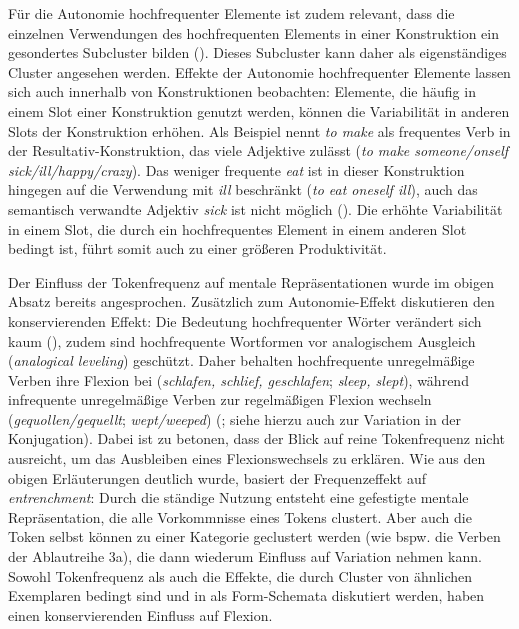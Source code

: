Für die Autonomie hochfrequenter Elemente ist zudem relevant, dass die einzelnen Verwendungen des hochfrequenten Elements in einer Konstruktion ein gesondertes Subcluster bilden (\cite[69--70]{Goldberg.2019}). Dieses Subcluster kann daher als eigenständiges Cluster angesehen werden. Effekte der Autonomie hochfrequenter Elemente lassen sich  auch innerhalb von Konstruktionen beobachten: Elemente, die häufig in einem Slot einer Konstruktion genutzt werden, können die Variabilität in anderen Slots der Konstruktion erhöhen. Als Beispiel nennt \textcite[69]{Goldberg.2019} \textit{to make} als frequentes Verb in der Resultativ-Konstruktion, das viele Adjektive zulässt (\textit{to make someone/onself sick/ill/happy/crazy}). Das weniger frequente \textit{eat} ist in dieser Konstruktion hingegen auf die Verwendung mit \textit{ill} beschränkt (\textit{to eat oneself ill}), auch das semantisch verwandte Adjektiv \textit{sick} ist nicht möglich (\cite[69]{Goldberg.2019}). Die erhöhte Variabilität in einem Slot, die durch ein hochfrequentes Element in einem anderen Slot bedingt ist, führt somit auch zu einer größeren Produktivität.

\begin{sloppypar}
Der Einfluss der Tokenfrequenz auf mentale Repräsentationen wurde im obigen Absatz bereits angesprochen. Zusätzlich zum Autonomie-Effekt diskutieren \textcite[378--384]{Bybee.1997} den konservierenden Effekt: Die Bedeutung hochfrequenter Wörter verändert sich kaum (\cite[12--13]{Ellis.2012}), zudem sind hochfrequente Wortformen vor analogischem Ausgleich (\textit{analogical leveling}) ge\-schützt. Daher behalten hochfrequente unregelmäßige Verben ihre Flexion bei (\textit{schlafen, schlief, geschlafen}; \textit{sleep, slept}), während infrequente unregelmäßige Verben zur regelmäßigen Flexion wechseln (\textit{gequollen/gequellt}; \textit{wept/weeped}) (\cites[119--120]{Bybee.1985}[280]{Bybee.1997}; siehe hierzu auch  zur Variation in der Konjugation). Dabei ist zu betonen, dass der Blick auf reine Tokenfrequenz nicht ausreicht, um das Ausbleiben eines Flexionswechsels zu erklären. Wie aus den obigen Erläuterungen deutlich wurde, basiert der Frequenzeffekt auf \textit{entrenchment}: Durch die ständige Nutzung entsteht eine gefestigte mentale Repräsentation, die alle Vorkommnisse eines Tokens clustert. Aber auch die Token selbst können zu einer Kategorie geclustert werden (wie bspw. die Verben der Ablautreihe 3a), die dann wiederum Einfluss auf Variation nehmen kann. Sowohl Tokenfrequenz als auch die Effekte, die durch Cluster von ähnlichen Exemplaren bedingt sind und in  als Form-Schemata diskutiert werden, haben einen konservierenden Einfluss auf Flexion. 
\end{sloppypar}
 

